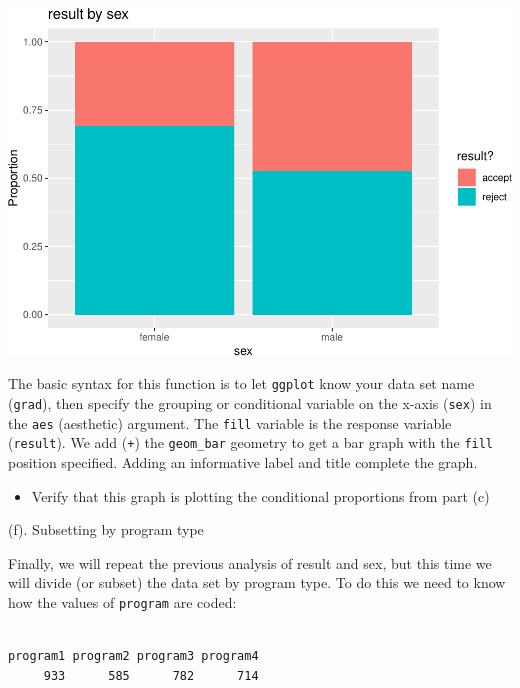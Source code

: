 \documentclass[
]{book}
\newenvironment{Shaded}{\begin{snugshade}}{\end{snugshade}}
\newcommand{\FunctionTok}[1]{\textcolor[rgb]{0.00,0.00,0.00}{#1}}
\newcommand{\NormalTok}[1]{#1}
\newcommand{\SpecialCharTok}[1]{\textcolor[rgb]{0.00,0.00,0.00}{#1}}
\providecommand{\tightlist}{%
  \setlength{\itemsep}{0pt}\setlength{\parskip}{0pt}}
\begin{document}
\includegraphics[width=1\linewidth]{Class_Activity_4_files/figure-latex/unnamed-chunk-25-1}

The basic syntax for this function is to let \texttt{ggplot} know your data set name (\texttt{grad}), then specify the grouping or conditional variable on the x-axis (\texttt{sex}) in the \texttt{aes} (aesthetic) argument. The \texttt{fill} variable is the response variable (\texttt{result}). We add (\texttt{+}) the \texttt{geom\_bar} geometry to get a bar graph with the \texttt{fill} position specified. Adding an informative label and title complete the graph.

\begin{itemize}
\tightlist
\item
  Verify that this graph is plotting the conditional proportions from part (c)
\end{itemize}

(f). Subsetting by program type

Finally, we will repeat the previous analysis of result and sex, but this time we will divide (or subset) the data set by program type. To do this we need to know how the values of \texttt{program} are coded:

\begin{Shaded}
\end{Shaded}

\begin{verbatim}

program1 program2 program3 program4 
     933      585      782      714 
\end{verbatim}
\end{document}
